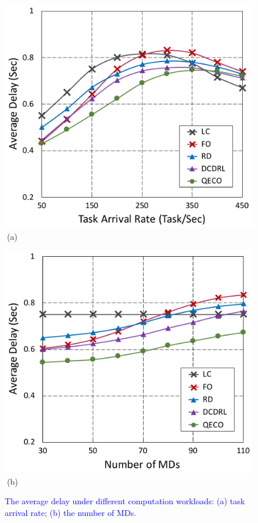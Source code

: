 \documentclass[10pt, journal,letterpaper]{IEEEtran}
\begin{document}
\begin{figure}[t]
	\captionsetup{name=Fig.}
	\begin{minipage}[b]{0.50\linewidth}
		\centering
		\includegraphics[width=\textwidth]{ delay_1} 		
		\textcolor{white}{i}\hspace{0.6cm}(a)
	\end{minipage}
	\hspace{-0.2cm}
	\begin{minipage}[b]{0.50\linewidth}
		\centering
		\includegraphics[width=\textwidth]{ delay_2}
		\textcolor{white}{i}\hspace{0.6cm}(b)
	\end{minipage}
	\vspace{-0.7cm}
	\caption{\textcolor{blue}{The average delay under different computation workloads: (a) task arrival rate; (b) the number of MDs.}}
	\label{chart3}
\end{figure} 
\end{document}
